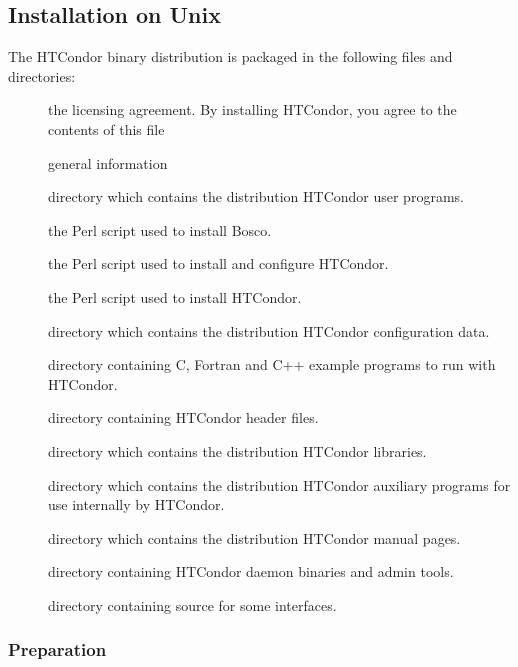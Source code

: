 \subsection{\label{sec:Unix-Install}
Installation on Unix}

The HTCondor binary distribution is packaged in the following files
and directories:

\begin{description}
\item[] the licensing agreement.
                  By installing HTCondor, you agree to the contents of
		  this file
\item[] general information
\item[] directory which contains the distribution HTCondor
		  user programs.
\item[] the Perl script used to install Bosco.
\item[] the Perl script used to install and
                  configure HTCondor.
\item[] the Perl script used to install HTCondor.
\item[] directory which contains the distribution HTCondor
		  configuration data.
\item[] directory containing C, Fortran and C++ example
		  programs to run with HTCondor.
\item[] directory containing HTCondor header files.
\item[] directory which contains the distribution HTCondor
		  libraries.
\item[] directory which contains the distribution HTCondor
		  auxiliary programs for use internally by HTCondor.
\item[] directory which contains the distribution HTCondor
		  manual pages.
\item[] directory containing HTCondor daemon binaries and admin
		  tools.
\item[] directory containing source for some interfaces.
\end{description}

\subsubsection{\label{sec:Preparing-to-Install}Preparation} 

